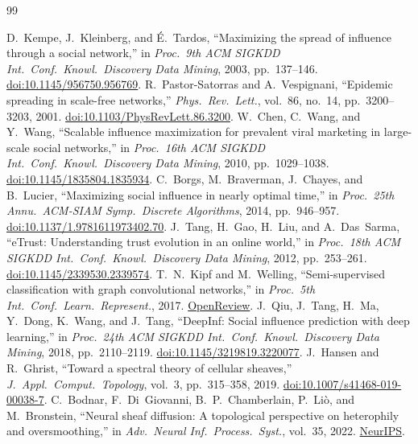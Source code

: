 \documentclass[a4paper,11pt,twocolumn]{ctexart}
\begin{document}
\begin{thebibliography}{99}
\raggedright
{} D.~Kempe, J.~Kleinberg, and {\'E}.~Tardos, ``Maximizing the spread of influence through a social network,'' in \emph{Proc.\ 9th ACM SIGKDD Int.\ Conf.\ Knowl.\ Discovery Data Mining}, 2003, pp.~137--146. \href{https://doi.org/10.1145/956750.956769}{doi:10.1145/956750.956769}.
 R.~Pastor-Satorras and A.~Vespignani, ``Epidemic spreading in scale-free networks,'' \emph{Phys.\ Rev.\ Lett.}, vol.~86, no.~14, pp.~3200--3203, 2001. \href{https://doi.org/10.1103/PhysRevLett.86.3200}{doi:10.1103/PhysRevLett.86.3200}.
 W.~Chen, C.~Wang, and Y.~Wang, ``Scalable influence maximization for prevalent viral marketing in large-scale social networks,'' in \emph{Proc.\ 16th ACM SIGKDD Int.\ Conf.\ Knowl.\ Discovery Data Mining}, 2010, pp.~1029--1038. \href{https://doi.org/10.1145/1835804.1835934}{doi:10.1145/1835804.1835934}.
 C.~Borgs, M.~Braverman, J.~Chayes, and B.~Lucier, ``Maximizing social influence in nearly optimal time,'' in \emph{Proc.\ 25th Annu.\ ACM-SIAM Symp.\ Discrete Algorithms}, 2014, pp.~946--957. \href{https://doi.org/10.1137/1.9781611973402.70}{doi:10.1137/1.9781611973402.70}.
 J.~Tang, H.~Gao, H.~Liu, and A.~Das~Sarma, ``eTrust: Understanding trust evolution in an online world,'' in \emph{Proc.\ 18th ACM SIGKDD Int.\ Conf.\ Knowl.\ Discovery Data Mining}, 2012, pp.~253--261. \href{https://doi.org/10.1145/2339530.2339574}{doi:10.1145/2339530.2339574}.
 T.~N.~Kipf and M.~Welling, ``Semi-supervised classification with graph convolutional networks,'' in \emph{Proc.\ 5th Int.\ Conf.\ Learn.\ Represent.}, 2017. \href{https://openreview.net/forum?id=SJU4ayYgl}{OpenReview}.
 J.~Qiu, J.~Tang, H.~Ma, Y.~Dong, K.~Wang, and J.~Tang, ``DeepInf: Social influence prediction with deep learning,'' in \emph{Proc.\ 24th ACM SIGKDD Int.\ Conf.\ Knowl.\ Discovery Data Mining}, 2018, pp.~2110--2119. \href{https://doi.org/10.1145/3219819.3220077}{doi:10.1145/3219819.3220077}.
 J.~Hansen and R.~Ghrist, ``Toward a spectral theory of cellular sheaves,'' \emph{J.\ Appl.\ Comput.\ Topology}, vol.~3, pp.~315--358, 2019. \href{https://doi.org/10.1007/s41468-019-00038-7}{doi:10.1007/s41468-019-00038-7}.
 C.~Bodnar, F.~Di~Giovanni, B.~P.~Chamberlain, P.~Li{\`o}, and M.~Bronstein, ``Neural sheaf diffusion: A topological perspective on heterophily and oversmoothing,'' in \emph{Adv.\ Neural Inf.\ Process.\ Syst.}, vol.~35, 2022. \href{https://proceedings.neurips.cc/paper_files/paper/2022/hash/1fd0d0695282f4d81705d5bb32d1e1d5-Abstract-Conference.html}{NeurIPS}.

\end{thebibliography}
\end{document}
